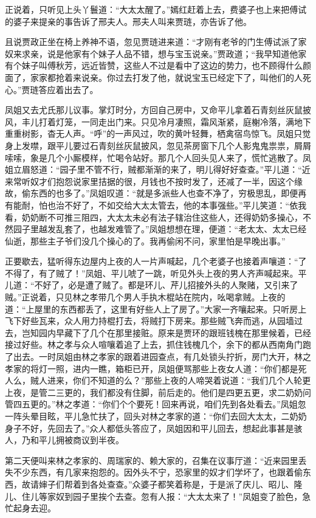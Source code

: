 \documentclass[12pt,oneside]{book}
\begin{document}
正说着，只听见上头丫鬟道：“大太太醒了。”嫣红赶着上去，费婆子也上来把傅试的婆子来提亲的事告诉了邢夫人。邢夫人叫来贾琏，亦告诉了他。

且说贾政正坐在椅上养神不语，忽见贾琏进来道：“才刚有老爷的门生傅试派了家奴来求亲，说是他家有个妹子人品不错，想与宝玉说亲。”贾政道；“我早知道他家有个妹子叫傅秋芳，远近皆赞，这些人不过是看中了这边的势力，也不顾得什么颜面了，家家都抢着来说亲。你过去打发了他，就说宝玉已经定下了，叫他们的人死心。”贾琏答应着出去了。

凤姐又去尤氏那儿议事。掌灯时分，方回自己房中，又命平儿拿着石青刻丝灰鼠披风，丰儿打着灯笼，一同走出门来。只见冷月凄照，霜风渐紧，庭榭冷落，满地下重重树影，杳无人声。“呼”的一声风过，吹的黄叶轻舞，栖禽宿鸟惊飞。凤姐只觉身上发噤，跟平儿要过石青刻丝灰鼠披风，忽见茶房窗下几个人影鬼鬼祟祟，屑屑嗦嗦，象是几个小厮模样，忙喝令站好。那几个人回头见人来了，慌忙逃散了。凤姐立眉怒道：“园子里不管不行，贼都渐渐的来了，明儿得好好查查。”平儿道：“近来常听奴才们抱怨说家里拮据的很，月钱也不按时发了，还减了一半，因这个缘故，偷东西的也多了。”凤姐叹道：“就是多派些人也查不净了，穷极思乱，即便再有能耐，怕也治不好了，不如交给大太太管去，他的本事强些。”平儿笑道：“依我看，奶奶断不可推三阻四，大太太未必有法子辖治住这些人，还得奶奶多操心，不然园子里越发乱套了，也越发难管了。”凤姐想想在理，便道：“老太太、太太已经仙逝，那些主子爷们没几个操心的了。我再偷闲不问，家里怕是早晚出事。”

正要歇去，猛听得东边屋内上夜的人一片声喊起，几个老婆子也接着声嚷道：“了不得了，有了贼了！”凤姐、平儿唬了一跳，听见外头上夜的男人齐声喊起来。平儿道：“不好了，必是遭了贼了。都是环儿、芹儿招接外头的人聚赌，又引来了贼。”正说着，只见林之孝带几个男人手执木棍站在院内，吆喝拿贼。上夜的道：“上屋里的东西都丢了，这里有好些人上了房了。”大家一齐嚷起来。只听房上飞下好些瓦来，众人用力持棍打去，将贼打下房来。那些贼飞奔而逃，从园墙过去，岂知园内早藏下了几个在那里接赃。原来是贾环的跟班钱槐在那里候着，已经接过好些。林之孝与众人喧嚷着追了上去，抓住钱槐几个，余下的都从西南角门跑了出去。一时凤姐由林之孝家的跟着进园查点，有几处锁头拧折，房门大开，林之孝家的将灯一照，进内一瞧，箱柜已开，凤姐便骂那些上夜女人道：“你们都是死人么，贼人进来，你们不知道的么？”那些上夜的人啼哭着说道：“我们几个人轮更上夜，是管二三更的，我们都没有住脚，前后走的。他们是四更五更，求二奶奶问管四五更的。”林之孝道：“你们个个要死！回来再说，咱们先到各处看去。”凤姐忽一阵头晕目眩，平儿急忙扶了，回头对林之孝家的道：“你们去回大太太，二奶奶身子不好，先回去了。”众人都低头答应了，凤姐因和平儿回去，想起此事甚是骇人，乃和平儿拥被商议到半夜。

第二天便叫来林之孝家的、周瑞家的、赖大家的，召集在议事厅道：“近来园里丢失不少东西，有几家来抱怨的。因外头不宁，恐家里的奴才们学坏了，也跟着偷东西，故请婶子们帮着到各处查查。”众婆子都笑着称是，于是派了庆儿、昭儿、隆儿、住儿等家奴到园子里挨个去查。忽有人报：“大太太来了！”凤姐变了脸色，急忙起身去迎。
\end{document}
